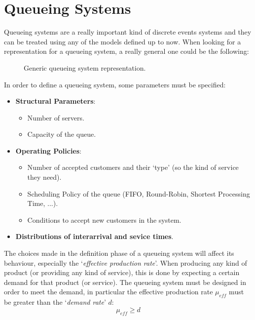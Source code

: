 \documentclass[12pt,a4paper]{article}
\begin{document}
\section{Queueing Systems}
Queueing systems are a really important kind of discrete events systems and they can be treated using any of the models defined up to now. When looking for a representation for a queueing system, a really general one could be the following:

\begin{figure}[H]
\begin{center}
\caption{\small Generic queueing system representation.}
\label{Picture 4}
\end{center}
\end{figure}
In order to define a queueing system, some parameters must be specified:
\begin{itemize}
\item \textbf{Structural Parameters}:
	\begin{itemize}
	\item Number of servers.
	\item Capacity of the queue.
	\end{itemize}
\item \textbf{Operating Policies}:
	\begin{itemize}
	\item Number of accepted customers and their `type' (so the kind of service they need).
	\item Scheduling Policy of the queue (FIFO, Round-Robin, Shortest Processing Time, ...).
	\item Conditions to accept new customers in the system.
	\end{itemize}
\item \textbf{Distributions of interarrival and sevice times}.
\end{itemize}
The choices made in the definition phase of a queueing system will affect its behaviour, especially the 
`\textit{effective production rate}'. When producing any kind of product (or providing any kind of service), this is done by expecting a certain demand for that product (or service). The queueing system must be designed in order to meet the demand, in particular the effective production rate $\mu_{eff}$ must be greater than the `\textit{demand rate}' $d$:
$$
\mu_{eff}\geq d
$$
\newpage
\end{document}

